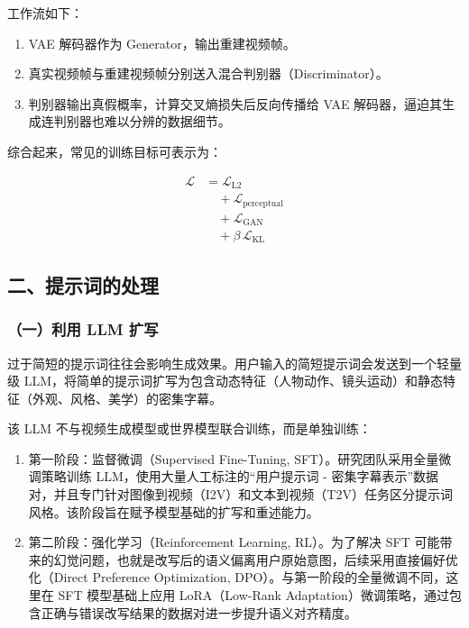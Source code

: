 工作流如下：

\begin{enumerate}
\def\labelenumi{\arabic{enumi}.}
\tightlist
\item
  VAE 解码器作为 Generator，输出重建视频帧。
\item
  真实视频帧与重建视频帧分别送入混合判别器（Discriminator）。
\item
  判别器输出真假概率，计算交叉熵损失后反向传播给 VAE 解码器，逼迫其生成连判别器也难以分辨的数据细节。
\end{enumerate}

综合起来，常见的训练目标可表示为：

\[
\begin{aligned}
\mathcal{L}
&= \mathcal{L}_{\mathrm{L2}}
\\
&\quad + \mathcal{L}_{\mathrm{perceptual}}
\\
&\quad + \mathcal{L}_{\mathrm{GAN}}
\\
&\quad + \beta\,\mathcal{L}_{\mathrm{KL}}
\end{aligned}
\]

\hypertarget{ux4e8cux63d0ux793aux8bcdux7684ux5904ux7406}{%
\subsection{二、提示词的处理}\label{ux4e8cux63d0ux793aux8bcdux7684ux5904ux7406}}

\hypertarget{ux4e00ux5229ux7528-llm-ux6269ux5199}{%
\subsubsection{（一）利用 LLM 扩写}\label{ux4e00ux5229ux7528-llm-ux6269ux5199}}

过于简短的提示词往往会影响生成效果。用户输入的简短提示词会发送到一个轻量级 LLM，将简单的提示词扩写为包含动态特征（人物动作、镜头运动）和静态特征（外观、风格、美学）的密集字幕。

该 LLM 不与视频生成模型或世界模型联合训练，而是单独训练：

\begin{enumerate}
\def\labelenumi{\arabic{enumi}.}
\tightlist
\item
  第一阶段：监督微调（Supervised Fine-Tuning, SFT）。研究团队采用全量微调策略训练 LLM，使用大量人工标注的``用户提示词 - 密集字幕表示''数据对，并且专门针对图像到视频（I2V）和文本到视频（T2V）任务区分提示词风格。该阶段旨在赋予模型基础的扩写和重述能力。
\item
  第二阶段：强化学习（Reinforcement Learning, RL）。为了解决 SFT 可能带来的幻觉问题，也就是改写后的语义偏离用户原始意图，后续采用直接偏好优化（Direct Preference Optimization, DPO）。与第一阶段的全量微调不同，这里在 SFT 模型基础上应用 LoRA（Low-Rank Adaptation）微调策略，通过包含正确与错误改写结果的数据对进一步提升语义对齐精度。
\end{enumerate}

